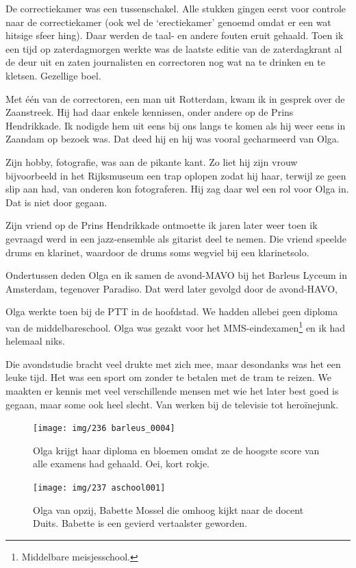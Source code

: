 \documentclass[10pt,twoside, openright]{memoir}
\begin{document}
De correctiekamer was een tussenschakel. Alle stukken gingen eerst voor controle naar de correctiekamer (ook wel de `erectiekamer' genoemd omdat er een wat hitsige sfeer hing). Daar werden de taal- en andere fouten eruit gehaald. Toen ik een tijd op zaterdagmorgen werkte was de laatste editie van de zaterdagkrant al de deur uit en zaten journalisten en correctoren nog wat na te drinken en te kletsen. Gezellige boel. 

Met één van de correctoren, een man uit Rotterdam, kwam ik in gesprek over de Zaanstreek. Hij had daar enkele kennissen, onder andere op de Prins Hendrikkade. Ik nodigde hem uit eens bij ons langs te komen als hij weer eens in Zaandam op bezoek was. Dat deed hij en hij was vooral gecharmeerd van Olga. 

Zijn hobby, fotografie, was aan de pikante kant. Zo liet hij  zijn vrouw bijvoorbeeld in het Rijksmuseum een trap oplopen zodat hij haar, terwijl ze geen slip aan had, van onderen kon fotograferen. Hij zag daar wel een rol voor Olga in. Dat is niet door gegaan. 

Zijn vriend op de Prins Hendrikkade ontmoette ik jaren later weer toen ik gevraagd werd in een jazz-ensemble als gitarist deel te nemen. Die vriend speelde drums en klarinet, waardoor  de drums soms wegviel bij een klarinetsolo.

Ondertussen deden Olga en ik samen de avond-MAVO bij het Barleus Lyceum in Amsterdam, tegenover Paradiso. Dat werd later gevolgd door de avond-HAVO,

Olga werkte toen bij de PTT in de hoofdstad. We hadden allebei geen diploma van de middelbareschool. Olga was gezakt voor het MMS-eindexamen\footnote{Middelbare meisjesschool.} en ik had helemaal niks.

Die avondstudie bracht veel drukte met zich mee, maar desondanks was het een leuke tijd. Het was een sport om zonder te betalen met de tram te reizen. We maakten er kennis met veel verschillende mensen met wie het later best goed is gegaan, maar some ook heel slecht. Van werken bij de televisie tot heroïnejunk.

\begin{figure}
\texttt{[image: img/236 barleus\_0004]}
\caption*{\footnotesize Olga krijgt haar diploma en bloemen omdat ze de hoogste score van alle examens had gehaald. Oei, kort rokje.}
\end{figure}

\begin{figure}
\texttt{[image: img/237 aschool001]}
\caption*{\footnotesize Olga van opzij, Babette Mossel die omhoog kijkt naar de docent Duits. Babette is een gevierd vertaalster geworden.}
\end{figure}
\end{document}
